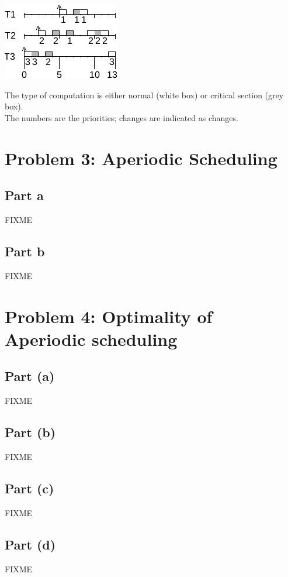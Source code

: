 \documentclass[a4paper,parskip,headheight=38pt]{scrartcl} %
\begin{document}
\includegraphics[width=\textwidth]{p3-schedule}

The type of computation is either normal (white box) or critical
section (grey box).
 \\
The numbers are the priorities; changes are indicated as changes.


\section*{Problem 3: Aperiodic Scheduling}

\subsection*{Part a}

FIXME

\subsection*{Part b}

FIXME


\section*{Problem 4: Optimality of Aperiodic scheduling}

\subsection*{Part (a)}

FIXME

\subsection*{Part (b)}

FIXME

\subsection*{Part (c)}

FIXME

\subsection*{Part (d)}

FIXME
\end{document}
